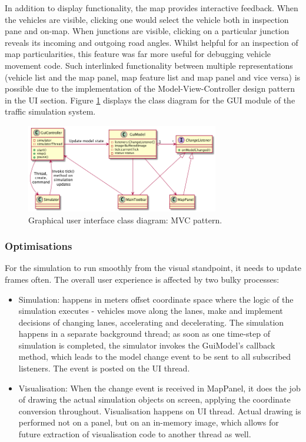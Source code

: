 In addition to display functionality, the map provides interactive feedback. When the vehicles are visible, clicking one would select the vehicle both in inspection pane and on-map. When junctions are visible, clicking on a particular junction reveals its incoming and outgoing road angles. Whilst helpful for an inspection of map particularities, this feature was far more useful for debugging vehicle movement code. Such interlinked functionality between multiple representations (vehicle list and the map panel, map feature list and map panel and vice versa) is possible due to the implementation of the Model-View-Controller design pattern in the UI section. Figure \ref{fig:guiMVC} displays the class diagram for the GUI module of the traffic simulation system.

\begin{figure}[h]
    \vspace{1.5em}
    \caption{Graphical user interface class diagram: MVC pattern.}
    \label{fig:guiMVC}
    \centering
    \includegraphics[width=0.75\textwidth]{../../uml_diagrams/GUI.png}
    \vspace{1.5em}
\end{figure}

\subsubsection{Optimisations}
For the simulation to run smoothly from the visual standpoint, it needs to update frames often. The overall user experience is affected by two bulky processes:
\begin{itemize}
    \item Simulation: happens in meters offset coordinate space where the logic of the simulation executes - vehicles move along the lanes, make and implement decisions of changing lanes, accelerating and decelerating. The simulation happens in a separate background thread; as soon as one time-step of simulation is completed, the simulator invokes the GuiModel's callback method, which leads to the model change event to be sent to all subscribed listeners. The event is posted on the UI thread.
    \item Visualisation: When the change event is received in MapPanel, it does the job of drawing the actual simulation objects on screen, applying the coordinate conversion throughout. Visualisation happens on UI thread. Actual drawing is performed not on a panel, but on an in-memory image, which allows for future extraction of visualisation code to another thread as well.
\end{itemize}


